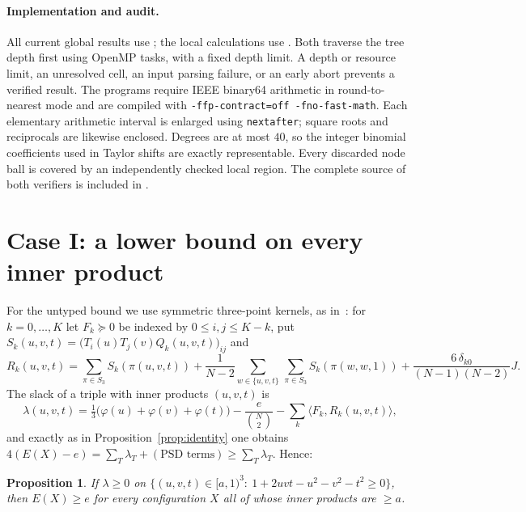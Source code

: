 \documentclass[11pt]{article}
\newtheorem{proposition}[theorem]{Proposition}
\theoremstyle{definition}
\newcommand{\ip}[2]{\langle #1,#2\rangle}
\newcommand{\PSD}{\succeq 0}
\begin{document}
\paragraph{Implementation and audit.}
All current global results use ; the local calculations use .
Both traverse the tree depth first using OpenMP tasks, with a fixed depth limit. A depth or resource limit, an unresolved
cell, an input parsing failure, or an early abort prevents a verified result. The programs require IEEE binary64 arithmetic in
round-to-nearest mode and are compiled with \texttt{-ffp-contract=off -fno-fast-math}.
Each elementary arithmetic interval is enlarged using \texttt{nextafter}; square roots and reciprocals are likewise
enclosed. Degrees are at most $40$, so the integer binomial coefficients used in Taylor shifts are exactly representable.
Every discarded node ball is covered by an independently checked local region.
The complete source of both verifiers is included in .

\section{Case I: a lower bound on every inner product}\label{sec:case1}
For the untyped bound we use symmetric three-point kernels, as in~\cite{CohnWoo}: for
$k=0,\dots,K$ let $F_k\PSD$ be indexed by $0\le i,j\le K-k$, put $S_k(u,v,t)=\big(T_i(u)T_j(v)Q_k(u,v,t)\big)_{ij}$ and
\[
 R_k(u,v,t)=\sum_{\pi\in S_3}S_k(\pi(u,v,t))+\frac{1}{N-2}\sum_{w\in\{u,v,t\}}\,\sum_{\pi\in S_3}S_k(\pi(w,w,1))
 +\frac{6\,\delta_{k0}}{(N-1)(N-2)}J .
\]
The slack of a triple with inner products $(u,v,t)$ is
\[
 \lambda(u,v,t)=\tfrac13\big(\varphi(u)+\varphi(v)+\varphi(t)\big)-\frac{e}{\binom N2}-\sum_k\ip{F_k}{R_k(u,v,t)},
\]
and exactly as in Proposition~\ref{prop:identity} one obtains
$4(E(X)-e)=\sum_T\lambda_T+(\text{PSD terms})\ge\sum_T\lambda_T$. Hence:

\begin{proposition}\label{prop:caseI}
If $\lambda\ge0$ on $\{(u,v,t)\in[a,1)^3:\ 1+2uvt-u^2-v^2-t^2\ge0\}$, then $E(X)\ge e$ for every configuration $X$ all of whose
inner products are $\ge a$.
\end{proposition}
\end{document}
